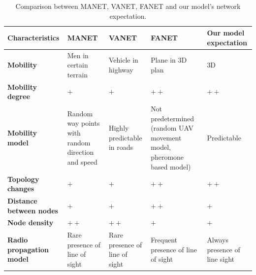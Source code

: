 \documentclass[11pt,openany]{book}
\begin{document}
\begin{table}[H]
    \centering
    \caption{Comparison between MANET, VANET, FANET and our model’s network expectation.}
    \label{tab:4.2}
    \begin{tabular}{|p{2.8cm}|p{1.5cm}|p{1.5cm}|p{1.8cm}|p{1.8cm}|}\hline
        \textbf{Characteristics}                                     & \textbf{MANET}                                    & \textbf{VANET}                 & \textbf{FANET}                                                       & \textbf{Our model expectation}
        \\\hline
        \textbf{Mobility}                                            & Men in certain terrain                            & Vehicle in highway             & Plane in 3D plan                                                     & 3D                             \\\hline
        \textbf{Mobility degree}                                     & $+$                                               & $+$                            & $++$                                                                 & $++$                           \\\hline
        \textbf{Mobility model}                                      & Random way points with random direction and speed & Highly predictable in roads    & Not predetermined (random UAV movement model, pheromone based model) & Predictable                    \\\hline
        \textbf{Topology changes}                                    & $+$                                               & $+$                            & $++$                                                                 & $++$                           \\\hline
        \textbf{Distance between nodes}                              & $+$                                               & $+$                            & $++$                                                                 & $+$                            \\\hline
        \textbf{Node density}                                        & $++$                                              & $++$                           & $+$                                                                  & $+$                            \\\hline
        \textbf{Radio propagation model}                             & Rare presence of line of sight                    & Rare presence of line of sight & Frequent presence of line of sight                                   & Always presence of line sight  \\\hline

\end{tabular}
\end{table}
\end{document}
